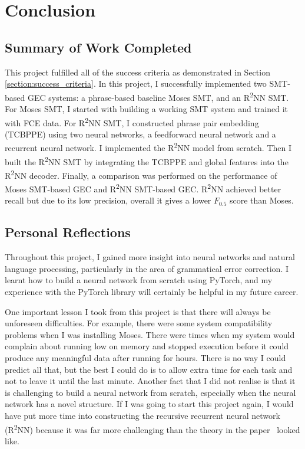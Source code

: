 \documentclass[12pt,a4paper,twoside]{report}
\begin{document}
\chapter{Conclusion}

\section{Summary of Work Completed}
This project fulfilled all of the success criteria as demonstrated in Section \ref{section:success_criteria}. In this project, I successfully implemented two SMT-based GEC systems: a phrase-based baseline Moses SMT, and an R\textsuperscript{2}NN SMT. For Moses SMT, I started with building a working SMT system and trained it with FCE data. For R\textsuperscript{2}NN SMT, I constructed phrase pair embedding (TCBPPE) using two neural networks, a feedforward neural network and a recurrent neural network. I implemented the R\textsuperscript{2}NN model from scratch. Then I built the R\textsuperscript{2}NN SMT by integrating the TCBPPE and global features into the R\textsuperscript{2}NN decoder. Finally, a comparison was performed on the performance of Moses SMT-based GEC and R\textsuperscript{2}NN SMT-based GEC. R\textsuperscript{2}NN achieved better recall but due to its low precision, overall it gives a lower $F_{0.5}$ score than Moses.

\section{Personal Reflections}
Throughout this project, I gained more insight into neural networks and natural language processing, particularly in the area of grammatical error correction. I learnt how to build a neural network from scratch using PyTorch, and my experience with the PyTorch library will certainly be helpful in my future career.

One important lesson I took from this project is that there will always be unforeseen difficulties. For example, there were some system compatibility problems when I was installing Moses. There were times when my system would complain about running low on memory and stopped execution before it could produce any meaningful data after running for hours. There is no way I could predict all that, but the best I could do is to allow extra time for each task and not to leave it until the last minute. Another fact that I did not realise is that it is challenging to build a neural network from scratch, especially when the neural network has a novel structure. If I was going to start this project again, I would have put more time into constructing the recursive recurrent neural network (R\textsuperscript{2}NN) because it was far more challenging than the theory in the paper~\cite{r2nn} looked like.
\end{document}
